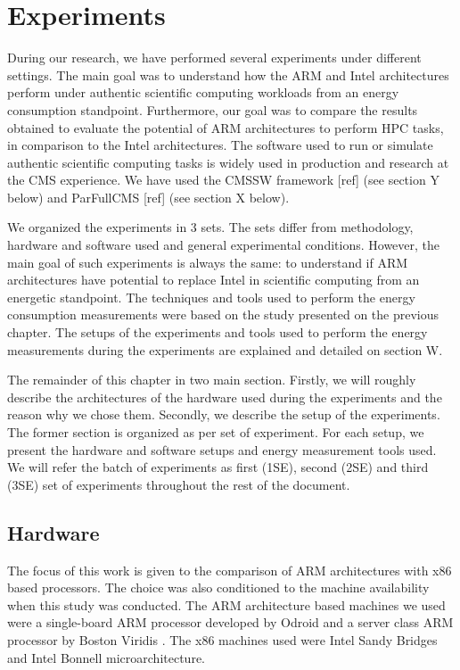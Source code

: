 \chapter{Experiments}


During our research, we have performed several experiments under different
settings. The main goal was to understand how the ARM and Intel architectures
perform under authentic scientific computing workloads from an energy
consumption standpoint. Furthermore, our goal was to compare the results
obtained to evaluate the potential of ARM architectures to perform HPC tasks, in
comparison to the Intel architectures.
The software used to run or simulate authentic scientific computing tasks is
widely used in production and research at the CMS experience. We have used the
CMSSW framework [ref] (see section Y below) and ParFullCMS [ref] (see section X
below).  

We organized the experiments in 3 sets. The sets differ from methodology,
hardware and software used and general experimental conditions. However, the
main goal of such experiments is always the same: to understand if ARM
architectures have potential to replace Intel in scientific computing from an
energetic standpoint. The techniques and tools used to perform the energy
consumption measurements were based on the study presented on the previous
chapter. The setups of the experiments and tools used to perform the energy
measurements during the experiments are explained and detailed on section W.

The remainder of this chapter in two main section. Firstly, we will roughly describe the
architectures of the hardware used during the experiments and the reason why we
chose them. Secondly, we describe
the setup of the experiments. The former section is organized as per set of experiment. 
For each setup, we present the hardware and software setups and energy measurement tools
used. We will refer the batch of experiments as first (1SE), second (2SE) and
third (3SE) set of experiments throughout the rest of the document. 


\section{Hardware}
The focus of this work is given to the comparison of ARM architectures with x86 based 
processors. The choice was also conditioned to the machine availability when this
study was conducted. The ARM architecture based machines we used were a single-board 
ARM processor developed by Odroid \cite{ODROID_XU3} and a server class ARM processor by Boston 
Viridis \cite{VIRIDIS}. The x86 machines used were Intel Sandy Bridges and Intel Bonnell
microarchitecture.


